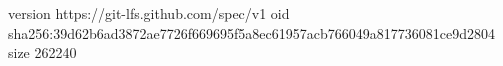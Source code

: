 version https://git-lfs.github.com/spec/v1
oid sha256:39d62b6ad3872ae7726f669695f5a8ec61957acb766049a817736081ce9d2804
size 262240
